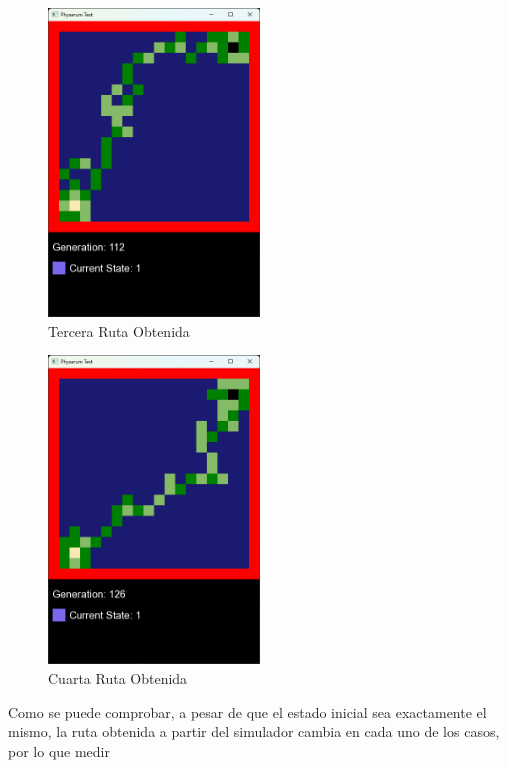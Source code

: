     \begin{figure}[htbp]
        \centering
        \includegraphics[width=0.5\textwidth]{./images/Pruebas/simulador/image015.png}
        \caption{Tercera Ruta Obtenida}
        \label{fig:Ruta 4}
    \end{figure}
    \vskip 0.5cm
    \begin{figure}[htbp]
        \centering
        \includegraphics[width=0.5\textwidth]{./images/Pruebas/simulador/image017.png}
        \caption{Cuarta Ruta Obtenida}
        \label{fig:Ruta 5}
    \end{figure}
    \vskip 0.5cm
    \clearpage
    Como se puede comprobar, a pesar de que el estado inicial
        sea exactamente el mismo, la ruta obtenida a partir del
        simulador cambia en cada uno de los casos, por lo que medir
